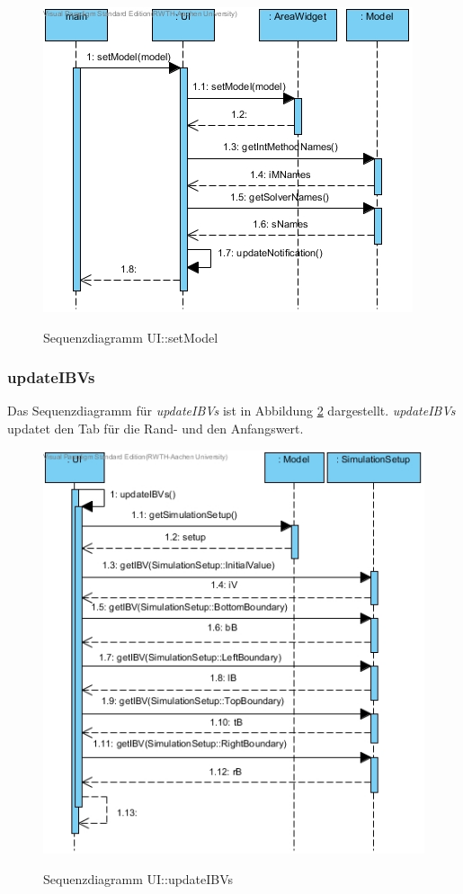 \begin{figure}[H]
	\centering
	\includegraphics[scale=.85]{Bilder/UI__setModel().jpg}\\
	\caption{Sequenzdiagramm UI::setModel}
	\label{Sequenzdiagramm UI::setModel}
\end{figure}

\subsubsection*{updateIBVs}

Das Sequenzdiagramm für \emph{updateIBVs} ist in Abbildung \ref{Sequenzdiagramm UI::updateIBVs} dargestellt. \emph{updateIBVs} updatet den Tab für die Rand- und den Anfangswert.

\begin{figure}[H]
	\centering
	\includegraphics[scale=.6]{Bilder/UI__updateIBVs().jpg}\\
	\caption{Sequenzdiagramm UI::updateIBVs}
	\label{Sequenzdiagramm UI::updateIBVs}
\end{figure}

